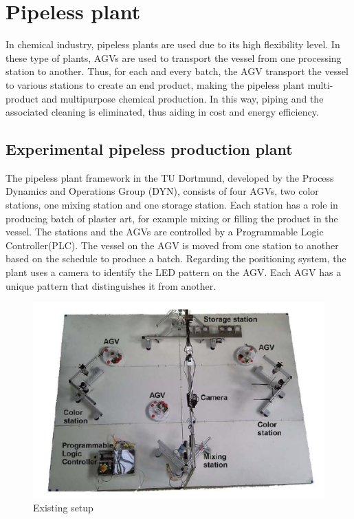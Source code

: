\section{Pipeless plant} %

In chemical industry, pipeless plants are used due to its high flexibility level. In these type of plants, AGVs are used to transport the vessel from one processing station to another. Thus, for each and every batch, the AGV transport the vessel to various stations to create an end product, making the pipeless plant multi-product and multipurpose chemical production. In this way, piping and the associated cleaning is eliminated, thus aiding in cost and energy efficiency.

\subsection{Experimental pipeless production plant}
 
 The pipeless plant framework in the TU Dortmund, developed by the Process Dynamics and Operations Group (DYN), consists of four AGVs, two color stations, one mixing station and one storage station. Each station has a role in producing batch of plaster art, for example mixing or filling the product in the vessel. The stations and the AGVs are controlled by a Programmable Logic Controller(PLC). The vessel on the AGV is moved from one station to another based on the schedule to produce a batch. Regarding the positioning system, the plant uses a camera to identify the LED pattern on the AGV. Each AGV has a unique pattern that distinguishes it from another.


\begin{figure}[!htbp]
	\centering
	\includegraphics[width=14cm]{Pictures/Plant.png}
	\caption{Existing setup}
	\label{Pipeless plant}
\end{figure}


